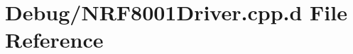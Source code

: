 \hypertarget{_debug_2_n_r_f8001_driver_8cpp_8d}{\section{\-Debug/\-N\-R\-F8001\-Driver.cpp.\-d \-File \-Reference}
\label{_debug_2_n_r_f8001_driver_8cpp_8d}
}
